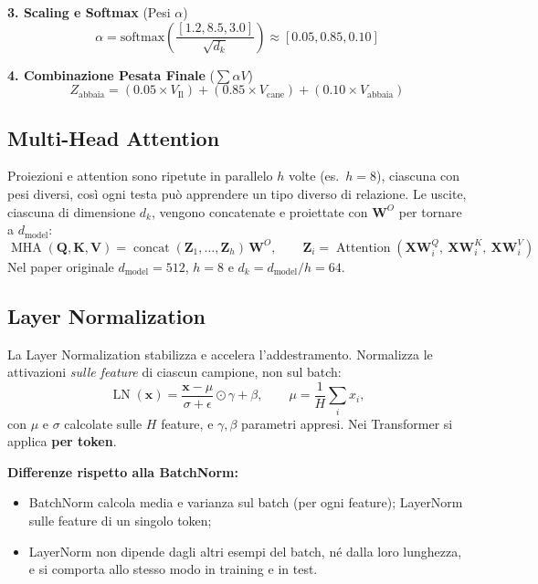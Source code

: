 \documentclass[11pt,a4paper]{article}
\begin{document}
\vspace{0.5cm}

\textbf{3. Scaling e Softmax} (Pesi $\alpha$)
\[
\alpha = \text{softmax} \left( \frac{[1.2, 8.5, 3.0]}{\sqrt{d_k}} \right) \approx [0.05, 0.85, 0.10]
\]

\textbf{4. Combinazione Pesata Finale} ($\sum \alpha V$)
\[
Z_{\text{abbaia}} = (0.05 \times V_{\text{Il}}) + (0.85 \times V_{\text{cane}}) + (0.10 \times V_{\text{abbaia}})
\]

\subsection{Multi-Head Attention}

Proiezioni e attention sono ripetute in parallelo $h$ volte (es.\ $h=8$), ciascuna con pesi diversi, così ogni testa 
può apprendere un tipo diverso di relazione. Le uscite, ciascuna di dimensione $d_k$, vengono concatenate e proiettate 
con $\mathbf{W}^O$ per tornare a $d_{\text{model}}$:
\[
\operatorname{MHA}(\mathbf{Q},\mathbf{K},\mathbf{V}) = \operatorname{concat}(\mathbf{Z}_1,\dots,\mathbf{Z}_h)\,\mathbf{W}^O,
\qquad
\mathbf{Z}_i = \operatorname{Attention}\!\left(\mathbf{X}\mathbf{W}_i^Q,\ \mathbf{X}\mathbf{W}_i^K,\ \mathbf{X}\mathbf{W}_i^V\right)
\]
Nel paper originale $d_{\text{model}}=512$, $h=8$ e $d_k=d_{\text{model}}/h=64$.

\subsection{Layer Normalization}

La Layer Normalization stabilizza e accelera l'addestramento. Normalizza le attivazioni \emph{sulle feature} 
di ciascun campione, non sul batch:
\[
\operatorname{LN}(\mathbf{x}) = \frac{\mathbf{x}-\mu}{\sigma+\epsilon}\odot\gamma+\beta,
\qquad \mu=\frac{1}{H}\sum_i x_i,
\]
con $\mu$ e $\sigma$ calcolate sulle $H$ feature, e $\gamma,\beta$ parametri appresi.
 Nei Transformer si applica \textbf{per token}.

\textbf{Differenze rispetto alla BatchNorm:}
\begin{itemize}
    \item BatchNorm calcola media e varianza sul batch (per ogni feature); LayerNorm sulle feature di un singolo token;
    \item LayerNorm non dipende dagli altri esempi del batch, né dalla loro lunghezza, e si 
    comporta allo stesso modo in training e in test.
\end{itemize}
\end{document}
